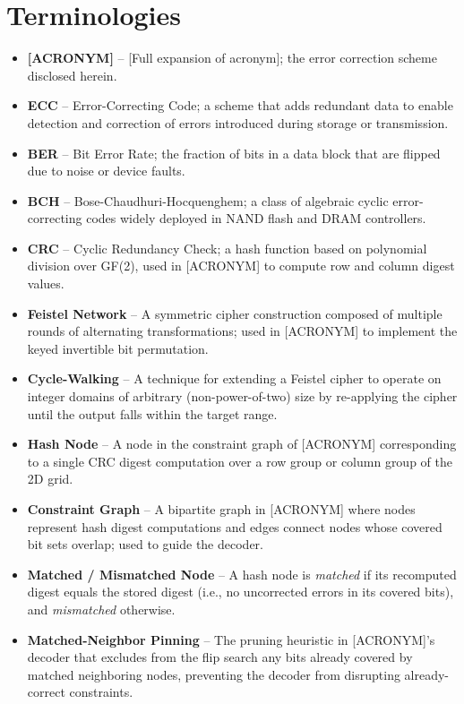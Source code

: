 \chapter*{Terminologies}
\begin{itemize}
    \item \textbf{[ACRONYM]} -- [Full expansion of acronym]; the error correction scheme disclosed herein.
    \item \textbf{ECC} -- Error-Correcting Code; a scheme that adds redundant data to enable detection and correction of errors introduced during storage or transmission.
    \item \textbf{BER} -- Bit Error Rate; the fraction of bits in a data block that are flipped due to noise or device faults.
    \item \textbf{BCH} -- Bose-Chaudhuri-Hocquenghem; a class of algebraic cyclic error-correcting codes widely deployed in NAND flash and DRAM controllers.
    \item \textbf{CRC} -- Cyclic Redundancy Check; a hash function based on polynomial division over GF(2), used in [ACRONYM] to compute row and column digest values.
    \item \textbf{Feistel Network} -- A symmetric cipher construction composed of multiple rounds of alternating transformations; used in [ACRONYM] to implement the keyed invertible bit permutation.
    \item \textbf{Cycle-Walking} -- A technique for extending a Feistel cipher to operate on integer domains of arbitrary (non-power-of-two) size by re-applying the cipher until the output falls within the target range.
    \item \textbf{Hash Node} -- A node in the constraint graph of [ACRONYM] corresponding to a single CRC digest computation over a row group or column group of the 2D grid.
    \item \textbf{Constraint Graph} -- A bipartite graph in [ACRONYM] where nodes represent hash digest computations and edges connect nodes whose covered bit sets overlap; used to guide the decoder.
    \item \textbf{Matched / Mismatched Node} -- A hash node is \emph{matched} if its recomputed digest equals the stored digest (i.e., no uncorrected errors in its covered bits), and \emph{mismatched} otherwise.
    \item \textbf{Matched-Neighbor Pinning} -- The pruning heuristic in [ACRONYM]'s decoder that excludes from the flip search any bits already covered by matched neighboring nodes, preventing the decoder from disrupting already-correct constraints.

\end{itemize}
